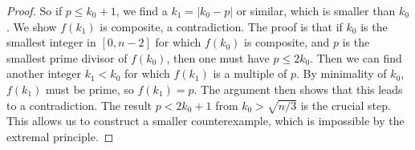 \begin{enumerate}
\begin{proof}
    So if $p \le k_0+1$, we find a $k_1 = |k_0-p|$ or similar, which is smaller than $k_0$. We show $f(k_1)$ is composite, a contradiction.
    The proof is that if $k_0$ is the smallest integer in $[0, n-2]$ for which $f(k_0)$ is composite, and $p$ is the smallest prime divisor of $f(k_0)$, then one must have $p \le 2k_0$.
    Then we can find another integer $k_1 < k_0$ for which $f(k_1)$ is a multiple of $p$.
    By minimality of $k_0$, $f(k_1)$ must be prime, so $f(k_1)=p$.
    The argument then shows that this leads to a contradiction.
    The result $p < 2k_0+1$ from $k_0 > \sqrt{n/3}$ is the crucial step. This allows us to construct a smaller counterexample, which is impossible by the extremal principle.
    \end{proof}
\end{enumerate}